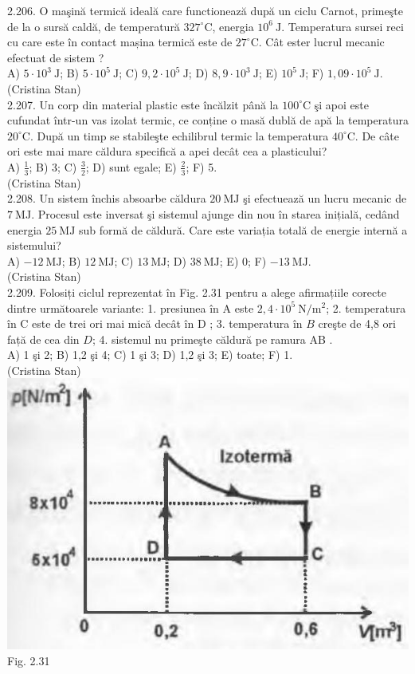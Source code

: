 2.206. O maşină termică ideală care functionează după un ciclu Carnot, primeşte de la o sursă caldă, de temperatură $327^{\circ} \mathrm{C}$, energia $10^{6} \mathrm{~J}$. Temperatura sursei reci cu care este în contact mașina termică este de $27^{\circ} \mathrm{C}$. Cât ester lucrul mecanic efectuat de sistem ?\\ A) $5 \cdot 10^{3} \mathrm{~J}$; B) $5 \cdot 10^{5} \mathrm{~J}$; C) $9,2 \cdot 10^{5} \mathrm{~J}$; D) $8,9 \cdot 10^{3} \mathrm{~J}$; E) $10^{5} \mathrm{~J}$; F) $1,09 \cdot 10^{5} \mathrm{~J}$.\\ (Cristina Stan)\\

2.207. Un corp din material plastic este încălzit până la $100^{\circ} \mathrm{C}$ şi apoi este cufundat într-un vas izolat termic, ce conține o masă dublă de apă la temperatura $20^{\circ} \mathrm{C}$. După un timp se stabileşte echilibrul termic la temperatura $40^{\circ} \mathrm{C}$. De câte ori este mai mare căldura specifică a apei decât cea a plasticului?\\ A) $\frac{1}{3}$; B) 3; C) $\frac{3}{2}$; D) sunt egale; E) $\frac{2}{3}$; F) 5.\\ (Cristina Stan)\\

2.208. Un sistem închis absoarbe căldura $20 \mathrm{~MJ}$ şi efectuează un lucru mecanic de $7 \mathrm{~MJ}$. Procesul este inversat şi sistemul ajunge din nou în starea inițială, cedând energia $25 \mathrm{~MJ}$ sub formă de căldură. Care este variația totală de energie internă a sistemului?\\ A) $-12 \mathrm{~MJ}$; B) $12 \mathrm{~MJ}$; C) $13 \mathrm{~MJ}$; D) $38 \mathrm{~MJ}$; E) 0; F) $-13 \mathrm{~MJ}$.\\ (Cristina Stan)\\

2.209. Folosiți ciclul reprezentat în Fig. 2.31 pentru a alege afirmațiile corecte dintre următoarele variante: 1. presiunea în A este $2,4 \cdot 10^{5} \mathrm{~N} / \mathrm{m}^{2}$; 2. temperatura în C este de trei ori mai mică decât în D ; 3. temperatura în $B$ creşte de 4,8 ori față de cea din $D$; 4. sistemul nu primeşte căldură pe ramura AB .\\ A) 1 şi 2; B) 1,2 şi 4; C) 1 şi 3; D) 1,2 şi 3; E) toate; F) 1.\\ (Cristina Stan)\\ \includegraphics[width=0.4\linewidth]{images/2025_07_01_5b3ff9fa0d508c8e9f17g-121} Fig. 2.31\\

